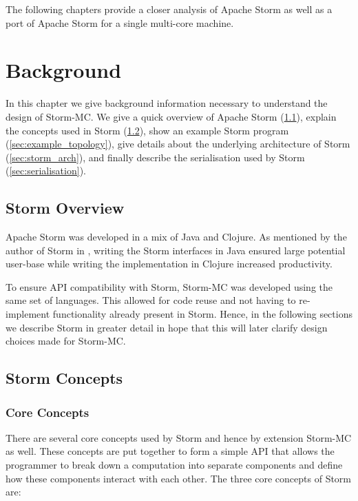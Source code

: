 \documentclass[bsc,logo,frontabs,twoside,singlespacing,normalheadings,parskip]{infthesis}\usepackage[]{graphicx}\usepackage[]{color}
\begin{document}
The following chapters provide a closer analysis of Apache Storm as well as a port of Apache Storm for a single multi-core machine.
\clearpage{}

\clearpage{}\chapter{Background}

In this chapter we give background information necessary to understand the design of Storm-MC. We give a quick overview of Apache Storm (\ref{sec:storm_overview}), explain the concepts used in Storm (\ref{sec:concepts}), show an example Storm program (\ref{sec:example_topology}), give details about the underlying architecture of Storm (\ref{sec:storm_arch}), and finally describe the serialisation used by Storm (\ref{sec:serialisation}).

\section{Storm Overview}
\label{sec:storm_overview}

Apache Storm was developed in a mix of Java and Clojure. As mentioned by the author of Storm in \cite{Marz_2014}, writing the Storm interfaces in Java ensured large potential user-base while writing the implementation in Clojure increased productivity.

To ensure API compatibility with Storm, Storm-MC was developed using the same set of languages. This allowed for code reuse and not having to re-implement functionality already present in Storm. Hence, in the following sections we describe Storm in greater detail in hope that this will later clarify design choices made for Storm-MC.

\section{Storm Concepts}
\label{sec:concepts}

\subsection{Core Concepts}

There are several core concepts used by Storm and hence by extension Storm-MC as well. These concepts are put together to form a simple API that allows the programmer to break down a computation into separate components and define how these components interact with each other. The three core concepts of Storm are:
\end{document}
